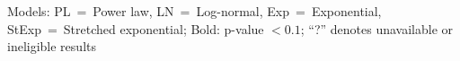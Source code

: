 \begin{center}\footnotesize
Models: PL~=~Power law, LN~=~Log-normal, Exp~=~Exponential, StExp~=~Stretched exponential; Bold: p-value $< 0.1$; ``?'' denotes unavailable or ineligible results
\end{center}
